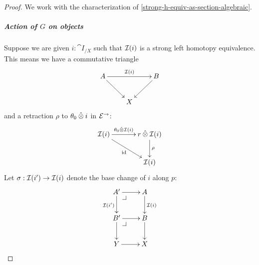 \documentclass[reqno,10pt,a4paper,oneside]{amsart}
\begin{document}
\begin{proof}
We work with the characterization of \cref{strong-h-equiv-as-section-algebraic}.

\hfill

\subparagraph{\textbf{Action of $G$ on objects}}

Suppose we are given $i : \cat{I}_{/X}$ such that $\cal{I}(i)$ is a strong left homotopy equivalence.
This means we have a commutative triangle
\[
\xymatrix{
  A
  \ar[rr]^{\cal{I}(i)}
  \ar[dr]
&&
  B
  \ar[dl]
\\&
  X
}
\]
and a retraction $\rho$ to $\thetal \hatotimes i$ in $\catE^{\to}$:
\[
\xymatrix@C+1em{
  \cal{I}(i)
  \ar[r]^-{\thetal \hatotimes \cal{I}(i)}
  \ar[dr]_{\id}
&
  \intervalr \hatotimes \cal{I}(i) \ar[d]^{\rho}
\\&
  \cal{I}(i)
}
\]
Let $\sigma : \cal{I}(i') \to \cal{I}(i)$ denote the base change of $i$ along $p$:
\[
\xymatrix{
  A'
  \ar[r]
  \ar[d]_{\cal{I}(i')}
  \pullback{dr}
&
  A
  \ar[d]^{\cal{I}(i)}
\\
  B'
  \ar[r]
  \ar[d]
  \pullback{dr}
&
  B
  \ar[d]
\\
  Y
  \ar[r]
&
  X
}
\]


\end{proof}
\end{document}
